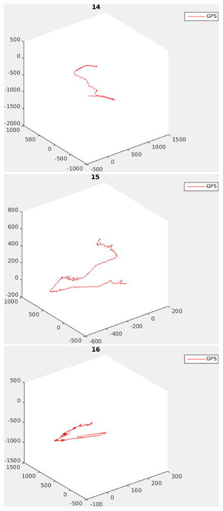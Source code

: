 \documentclass{report}
\begin{document}
\begin{figure}
\begin{minipage}[b]{.5\textwidth}
  \end{minipage}%
  \begin{minipage}[b]{.5\textwidth}
    \centering
    \includegraphics[width=.9\textwidth]{14_path}
  \end{minipage}
  \begin{minipage}[b]{.5\textwidth}
    \centering
    \includegraphics[width=.9\textwidth]{15_path}
  \end{minipage}%
  \begin{minipage}[b]{.5\textwidth}
    \centering
    \includegraphics[width=.9\textwidth]{16_path}

\end{minipage}
\end{figure}
\end{document}

